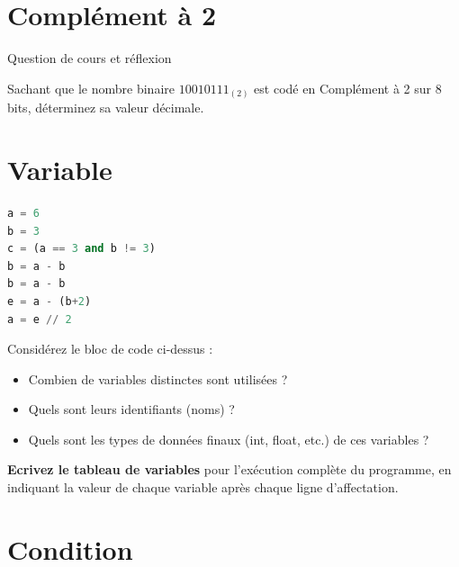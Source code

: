 \documentclass[a4paper, noanswers, addpoints, 12pt]{exam}
\begin{document}
\begin{questions}
\section{Complément à 2}

\question[1] Question de cours et réflexion

\question[1] Sachant que le nombre binaire $1001 0111_{(2)}$ est codé en Complément à 2 sur 8 bits, déterminez sa valeur décimale.

\section{Variable}
\begin{lstlisting}[language=Python]
a = 6
b = 3
c = (a == 3 and b != 3)
b = a - b
b = a - b
e = a - (b+2)
a = e // 2
\end{lstlisting}
\question[1 \half] Considérez le bloc de code ci-dessus :
\begin{itemize}
    \item Combien de variables distinctes sont utilisées ?
    \item Quels sont leurs identifiants (noms) ?
    \item Quels sont les types de données finaux (int, float, etc.) de ces variables ?
\end{itemize}
\question[2] \textbf{Ecrivez le tableau de variables} pour l'exécution complète du programme, en indiquant la valeur de chaque variable après chaque ligne d'affectation.

\newpage
\section{Condition}


\end{questions}
\end{document}
